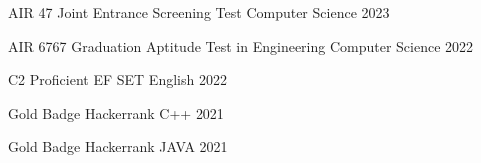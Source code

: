 
\begin{cvhonors}

  \cvhonor
    {AIR 47} %
    {Joint Entrance Screening Test} %
    {Computer Science} %
    {2023} %

  \cvhonor
    {AIR 6767} %
    {Graduation Aptitude Test in Engineering} %
    {Computer Science} %
    {2022} %

  \cvhonor
    {C2 Proficient} %
    {EF SET} %
    {English} %
    {2022} %

  \cvhonor
    {Gold Badge} %
    {Hackerrank} %
    {C++} %
    {2021} %

  \cvhonor
    {Gold Badge} %
    {Hackerrank} %
    {JAVA} %
    {2021} %

\end{cvhonors}


